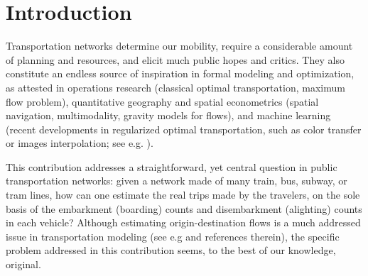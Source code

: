 \documentclass{bmcart}
\begin{document}
\begin{frontmatter}
\begin{abstractbox}

\begin{keyword}
\end{keyword}


\end{abstractbox}

\end{frontmatter}



\section{Introduction}
Transportation networks determine our mobility, require a considerable amount of planning and resources, and elicit much public hopes and critics. 
They also constitute an endless source of inspiration in formal modeling and optimization, as attested in operations research (classical optimal transportation, maximum flow problem), quantitative geography and spatial econometrics (spatial navigation, multimodality, gravity models for flows), and machine learning (recent developments in regularized optimal transportation, such as color transfer or images interpolation; see e.g. \cite{peyre2019computational}). 

This contribution addresses a straightforward, yet central question  in public transportation networks: given a network made of many train, bus, subway, or tram lines, how can one estimate the real trips made by the travelers, on the sole basis of the embarkment (boarding) counts and disembarkment (alighting) counts in each vehicle? Although estimating origin-destination flows is a much addressed issue in transportation modeling (see e.g \cite{bell1997transportation} \cite{hazelton2000estimation} \cite{ashok2002estimation} \cite{cui2006bus} and references therein), the specific problem addressed in this contribution seems, to the best of our knowledge, original. 
\end{document}
